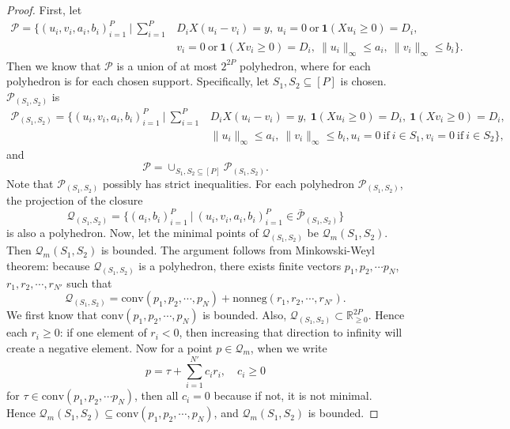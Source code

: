 \documentclass{article}
\begin{document}
\begin{proof}
First, let
\begin{align*}
\mathcal{P} = \Big\{ (u_i, v_i, a_i, b_i)_{i=1}^{P} \ | \ \sum_{i=1}^{P} &D_iX(u_i-v_i) = y, \ u_i = 0 \ \textrm{or} \ \mathbf{1}(Xu_i \geq 0) = D_i,\\
\ &v_i = 0 \ \textrm{or} \ \mathbf{1}(Xv_i \geq 0) = D_i, \ \|u_i\|_\infty \leq a_i,\ \|v_i\|_\infty \leq b_i \Big\}.
\end{align*}
Then we know that $\mathcal{P}$ is a union of at most $2^{2P}$ polyhedron, where for each polyhedron is for each chosen support. Specifically, let $S_1, S_2 \subseteq [P]$ is chosen. $\mathcal{P}_{(S_1,S_2)}$ is
\begin{align*}
\mathcal{P}_{(S_1,S_2)} = \Big\{ (u_i, v_i, a_i, b_i)_{i=1}^{P} \ | \ \sum_{i=1}^{P} &D_iX(u_i-v_i) = y, \ \mathbf{1}(Xu_i \geq 0) = D_i,\ \mathbf{1}(Xv_i \geq 0) = D_i, \ \\
&\|u_i\|_\infty \leq a_i,\ \|v_i\|_\infty \leq b_i,
u_i = 0 \ \textrm{if}\ i \in S_1, v_i = 0 \ \textrm{if}\ i \in S_2 \Big\},
\end{align*}
and 
\[
\mathcal{P} = \cup_{S_1, S_2 \subseteq [P]} \mathcal{P}_{(S_1,S_2)}.
\]
Note that $\mathcal{P}_{(S_1, S_2)}$ possibly has strict inequalities. For each polyhedron $\mathcal{P}_{(S_1,S_2)}$, the projection of the closure
\[
\mathcal{Q}_{(S_1,S_2)} = \Big\{(a_i, b_i)_{i=1}^{P} \ | \ (u_i, v_i, a_i, b_i)_{i=1}^{P} \in \mathcal{\bar{P}}_{(S_1,S_2)} \Big\}
\]
is also a polyhedron. Now, let the minimal points of $\mathcal{Q}_{(S_1,S_2)}$ be $\mathcal{Q}_m(S_1,S_2)$. Then $\mathcal{Q}_m(S_1,S_2)$ is bounded. The argument follows from Minkowski-Weyl theorem: because $\mathcal{Q}_{(S_1,S_2)}$ is a polyhedron, there exists finite vectors $p_1, p_2, \cdots p_N$, $r_1, r_2, \cdots , r_{N'}$ such that 
\[
\mathcal{Q}_{(S_1,S_2)} = \textrm{conv}(p_1, p_2, \cdots, p_N) + \textrm{nonneg}(r_1, r_2, \cdots, r_{N'}).
\]
We first know that $\textrm{conv}(p_1, p_2, \cdots, p_N)$ is bounded. Also, $\mathcal{Q}_{(S_1,S_2)} \subset \mathbb{R}_{\geq 0}^{2P}$. Hence each $r_i \geq 0$: if one element of $r_i < 0$, then increasing that direction to infinity will create a negative element. Now for a point $p \in \mathcal{Q}_m$, when we write
\[
p = \tau + \sum_{i=1}^{N'} c_i r_i, \quad c_i \geq 0
\]
for $\tau \in \textrm{conv}(p_1, p_2, \cdots p_N)$, then all $c_i = 0$ because if not, it is not minimal. Hence $\mathcal{Q}_m(S_1,S_2) \subseteq \textrm{conv}(p_1, p_2, \cdots , p_N)$, and $\mathcal{Q}_m(S_1,S_2)$ is bounded. 


\end{proof}
\end{document}
